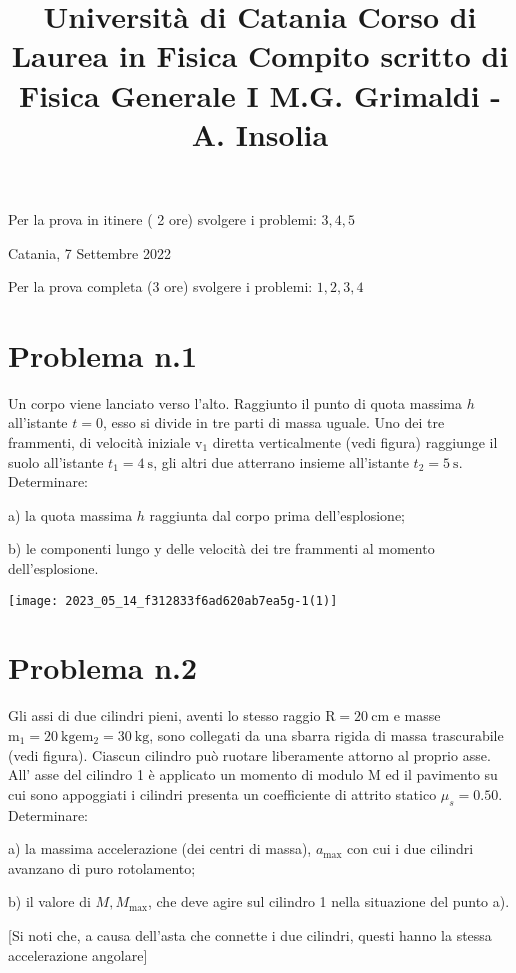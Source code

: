 \documentclass[10pt]{article}
\title{Università di Catania 
 Corso di Laurea in Fisica 
 Compito scritto di Fisica Generale I 
 M.G. Grimaldi - A. Insolia }
\author{}
\date{}
\begin{document}
\maketitle
Per la prova in itinere ( 2 ore) svolgere i problemi: \(3,4,5\)

Catania, 7 Settembre 2022

Per la prova completa (3 ore) svolgere i problemi: \(1,2,3,4\)

\section{Problema n.1}
Un corpo viene lanciato verso l'alto. Raggiunto il punto di quota massima \(h\) all'istante \(t=0\), esso si divide in tre parti di massa uguale. Uno dei tre frammenti, di velocità iniziale \(\mathrm{v}_{1}\) diretta verticalmente (vedi figura) raggiunge il suolo all'istante \(t_{1}=4 \mathrm{~s}\), gli altri due atterrano insieme all'istante \(t_{2}=5 \mathrm{~s}\). Determinare:

a) la quota massima \(h\) raggiunta dal corpo prima dell'esplosione;

b) le componenti lungo y delle velocità dei tre frammenti al momento dell'esplosione.

\begin{center}
\texttt{[image: 2023\_05\_14\_f312833f6ad620ab7ea5g-1(1)]}
\end{center}

\section{Problema n.2}
Gli assi di due cilindri pieni, aventi lo stesso raggio \(\mathrm{R}=20 \mathrm{~cm}\) e masse \(\mathrm{m}_{1}=20 \mathrm{~kg} \mathrm{e} \mathrm{m}_{2}=30 \mathrm{~kg}\), sono collegati da una sbarra rigida di massa trascurabile (vedi figura). Ciascun cilindro può ruotare liberamente attorno al proprio asse. All' asse del cilindro 1 è applicato un momento di modulo \(\mathrm{M}\) ed il pavimento su cui sono appoggiati i cilindri presenta un coefficiente di attrito statico \(\mu_{s}=0.50\). Determinare:

a) la massima accelerazione (dei centri di massa), \(a_{\max }\) con cui i due cilindri avanzano di puro rotolamento;

b) il valore di \(M, M_{\max }\), che deve agire sul cilindro 1 nella situazione del punto a).

[Si noti che, a causa dell'asta che connette i due cilindri, questi hanno la stessa accelerazione angolare]
\end{document}
